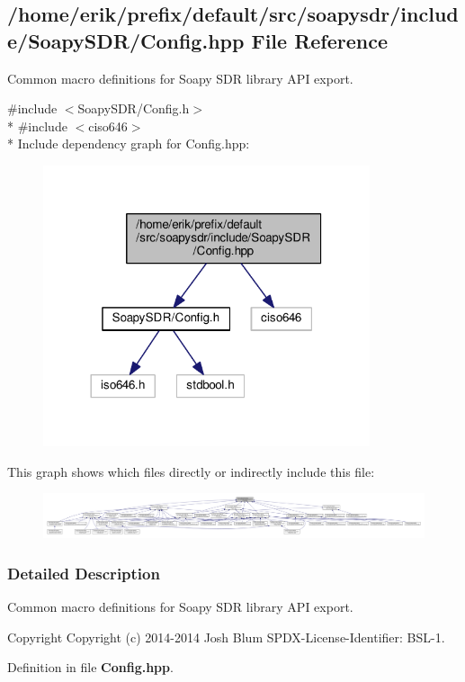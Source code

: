 \subsection{/home/erik/prefix/default/src/soapysdr/include/\+Soapy\+S\+D\+R/\+Config.hpp File Reference}
\label{Config_8hpp}


Common macro definitions for Soapy S\+DR library A\+PI export.  


{\ttfamily \#include $<$Soapy\+S\+D\+R/\+Config.\+h$>$}\\*
{\ttfamily \#include $<$ciso646$>$}\\*
Include dependency graph for Config.\+hpp\+:
\nopagebreak
\begin{figure}[H]
\begin{center}
\leavevmode
\includegraphics[width=272pt]{de/dc4/Config_8hpp__incl}
\end{center}
\end{figure}
This graph shows which files directly or indirectly include this file\+:
\nopagebreak
\begin{figure}[H]
\begin{center}
\leavevmode
\includegraphics[width=350pt]{da/d76/Config_8hpp__dep__incl}
\end{center}
\end{figure}


\subsubsection{Detailed Description}
Common macro definitions for Soapy S\+DR library A\+PI export. 

\begin{DoxyCopyright}{Copyright}
Copyright (c) 2014-\/2014 Josh Blum S\+P\+D\+X-\/\+License-\/\+Identifier\+: B\+S\+L-\/1. 
\end{DoxyCopyright}


Definition in file {\bf Config.\+hpp}.

